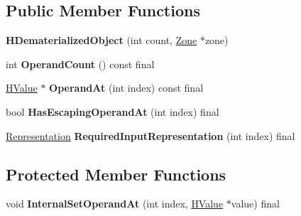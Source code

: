 \subsection*{Public Member Functions}
\begin{DoxyCompactItemize}
\item 
{\bfseries H\+Dematerialized\+Object} (int count, \hyperlink{classv8_1_1internal_1_1_zone}{Zone} $\ast$zone)\hypertarget{classv8_1_1internal_1_1_h_dematerialized_object_a0d264866b1a482250547eb35a94d13ca}{}\label{classv8_1_1internal_1_1_h_dematerialized_object_a0d264866b1a482250547eb35a94d13ca}

\item 
int {\bfseries Operand\+Count} () const  final\hypertarget{classv8_1_1internal_1_1_h_dematerialized_object_a26a81eb53b9ab48ac405b41f0d5d881f}{}\label{classv8_1_1internal_1_1_h_dematerialized_object_a26a81eb53b9ab48ac405b41f0d5d881f}

\item 
\hyperlink{classv8_1_1internal_1_1_h_value}{H\+Value} $\ast$ {\bfseries Operand\+At} (int index) const  final\hypertarget{classv8_1_1internal_1_1_h_dematerialized_object_ae64495553db757d1b013aea522aa0aea}{}\label{classv8_1_1internal_1_1_h_dematerialized_object_ae64495553db757d1b013aea522aa0aea}

\item 
bool {\bfseries Has\+Escaping\+Operand\+At} (int index) final\hypertarget{classv8_1_1internal_1_1_h_dematerialized_object_aa6900a0d51e7148dea1fb768d91401a6}{}\label{classv8_1_1internal_1_1_h_dematerialized_object_aa6900a0d51e7148dea1fb768d91401a6}

\item 
\hyperlink{classv8_1_1internal_1_1_representation}{Representation} {\bfseries Required\+Input\+Representation} (int index) final\hypertarget{classv8_1_1internal_1_1_h_dematerialized_object_a55361a63bfeacff1f09a3f2b461e0ec8}{}\label{classv8_1_1internal_1_1_h_dematerialized_object_a55361a63bfeacff1f09a3f2b461e0ec8}

\end{DoxyCompactItemize}
\subsection*{Protected Member Functions}
\begin{DoxyCompactItemize}
\item 
void {\bfseries Internal\+Set\+Operand\+At} (int index, \hyperlink{classv8_1_1internal_1_1_h_value}{H\+Value} $\ast$value) final\hypertarget{classv8_1_1internal_1_1_h_dematerialized_object_a8fc55bbe1637a1e82c8143a4d349966d}{}\label{classv8_1_1internal_1_1_h_dematerialized_object_a8fc55bbe1637a1e82c8143a4d349966d}

\end{DoxyCompactItemize}
